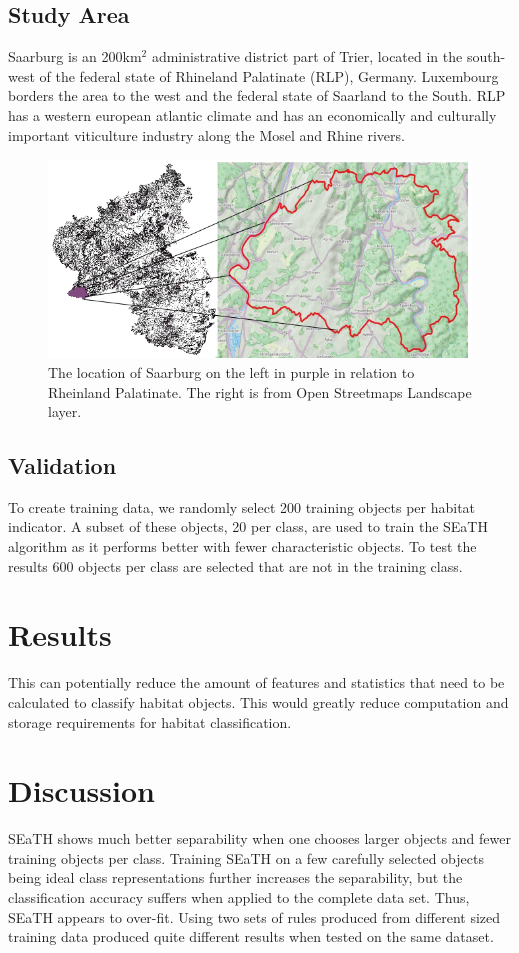 \documentclass[authoryear, review,12pt,number]{elsarticle}
\begin{document}
\subsection{Study Area}
Saarburg is an 200km$^{2}$ administrative district part of Trier, located in the
south-west of the federal state of Rhineland Palatinate (RLP), Germany.
Luxembourg borders the area to the west and the federal state of Saarland to the South.
RLP has a western european atlantic climate and has an
economically and culturally important viticulture industry along the Mosel and
Rhine rivers.
\begin{figure}
	\includegraphics[width=\textwidth]{diagrams/study_area_closeup.png}
	\caption{The location of Saarburg on the left in purple in relation to 
Rheinland Palatinate. The right is from Open Streetmaps Landscape layer. }
\end{figure}

\subsection{Validation}
To create training data, we randomly select 200 training objects per habitat
indicator. A subset of these objects, 20 per class, are used to train the SEaTH
algorithm as it performs better with fewer characteristic objects. To test the 
results 600 objects per class are selected that are not in the training class.

\section{Results}
This can potentially reduce the amount of features
and statistics that need to be calculated to classify habitat objects. This
would greatly reduce computation and storage requirements for habitat
classification.
\section{Discussion}
SEaTH shows much better separability when one chooses larger objects and fewer
training objects per class. Training SEaTH on a few carefully selected objects
being ideal class representations further increases the separability, but the 
classification
accuracy suffers when applied to the complete data set. Thus, SEaTH appears to
over-fit. Using two sets of rules produced from different sized training data
produced quite different results when tested on the same dataset.
\end{document}
